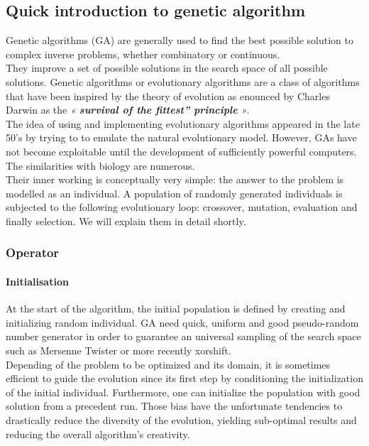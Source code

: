 \documentclass[12pt]{memoir}
\begin{document}
\subsection{Quick introduction to genetic algorithm} %
\label{sub:Quick introduction to genetic algorithm}


Genetic algorithms (GA) are generally used to find the best possible solution to complex
inverse problems, whether combinatory or continuous. \\
They improve  a set of possible solutions in the search space of all possible solutions.
Genetic algorithms or evolutionary algorithms are a class of algorithms that have been 
inspired by the theory of evolution as enounced by Charles Darwin as the 
\emph{« \textbf{survival of the fittest” principle} »}. \\
The idea of using and implementing evolutionary algorithms appeared in the 
late 50’s\cite{john1992adaptation} by trying to to emulate the natural evolutionary model.
However, GAs have not become exploitable until the development of sufficiently powerful 
computers. The similarities with biology are numerous. \\
Their inner working is conceptually very simple: the answer to the problem is modelled
as an  individual. A population of randomly generated individuals is subjected to the
following evolutionary loop: crossover, mutation, evaluation and finally selection.
We will explain them in detail shortly.



\subsubsection{Operator} %
\label{sub:}
\paragraph{Initialisation} %
\label{par:Initialisation}

At the start of the algorithm, the initial population is defined by creating and 
initializing random individual. GA need quick, uniform and good pseudo-random number
generator in order to guarantee an universal sampling of the search space such as 
Mersenne Twister or more recently xorshift. \\
Depending of the problem to be optimized and its domain, it is sometimes efficient
to guide the evolution since its first step by conditioning the initialization of
the initial individual. Furthermore, one can initialize the population with good
solution from a precedent run. Those bias have the unfortunate tendencies to 
drastically reduce the diversity of the evolution, yielding sub-optimal results
and reducing the overall algorithm’s creativity.
\end{document}

